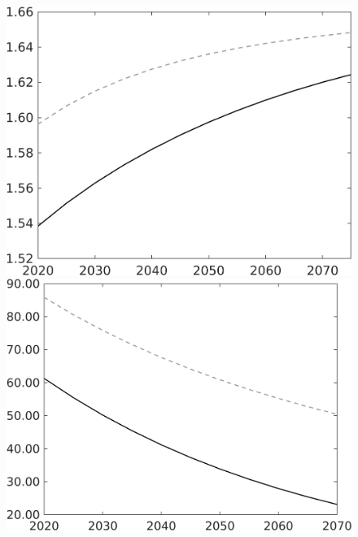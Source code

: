 \documentclass[12pt]{article}
\begin{document}
\begin{figure}
\begin{minipage}[]{0.32\textwidth}
	\end{minipage}		
	\begin{minipage}[]{0.32\textwidth}
		\includegraphics[width=1\textwidth]{../../codding_model/own_basedOnFried/optimalPol_010922_revision/figures/all_13Sept22/LevTaufNoTauf_TaulCalib_Equlab_regime0_pn_spillover0_nsk0_xgr0_knspil1_sep1_LFlimit0_emsbase0_countec0_GovRev0_etaa0.79_lgd0.png}
	\end{minipage}
	\begin{minipage}[]{0.32\textwidth}
		\includegraphics[width=1\textwidth]{../../codding_model/own_basedOnFried/optimalPol_010922_revision/figures/all_13Sept22/LevTaufNoTauf_TaulCalib_Equlab_regime0_gAf_spillover0_nsk0_xgr0_knspil1_sep1_LFlimit0_emsbase0_countec0_GovRev0_etaa0.79_lgd0.png}

\end{minipage}
\end{figure}
\end{document}
